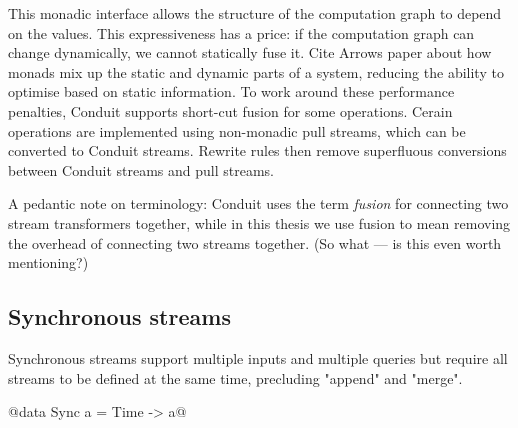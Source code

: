 This monadic interface allows the structure of the computation graph to depend on the values.
This expressiveness has a price: if the computation graph can change dynamically, we cannot statically fuse it.
Cite Arrows paper about how monads mix up the static and dynamic parts of a system, reducing the ability to optimise based on static information.
To work around these performance penalties, Conduit supports short-cut fusion for some operations.
Cerain operations are implemented using non-monadic pull streams, which can be converted to Conduit streams.
Rewrite rules then remove superfluous conversions between Conduit streams and pull streams.

A pedantic note on terminology: Conduit uses the term \emph{fusion} for connecting two stream transformers together, while in this thesis we use fusion to mean removing the overhead of connecting two streams together.
(So what --- is this even worth mentioning?)


\subsection{Synchronous streams}
Synchronous streams support multiple inputs and multiple queries but require all streams to be defined at the same time, precluding "append" and "merge".

@data Sync a = Time -> a@

